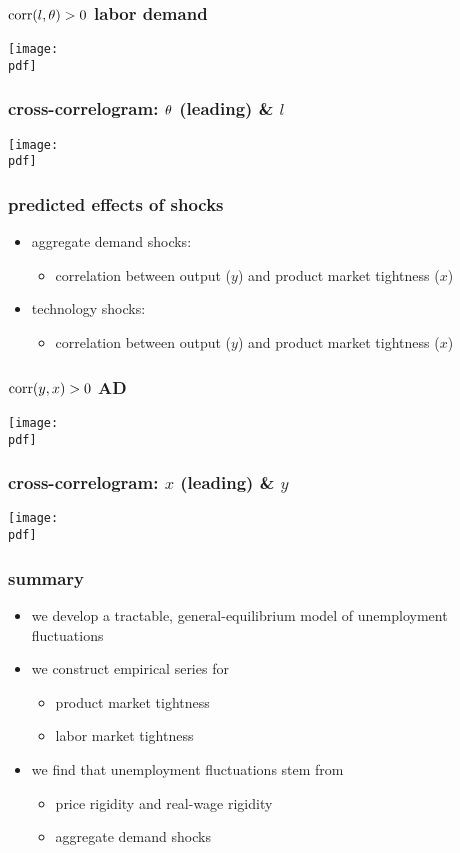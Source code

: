 \documentclass[12pt,xcolor={dvipsnames},hyperref={pdftex,pdfpagemode=UseNone,hidelinks,pdfdisplaydoctitle=true},usepdftitle=false]{beamer}
\def\pdf{xad.pdf}
\begin{document}
\begin{frame}
\frametitle{$\operatorname{corr}(l,\theta)>0$ \so labor demand}
\texttt{[image: \\pdf]}%
\end{frame}

\begin{frame}
\frametitle{cross-correlogram: $\theta$ (leading) \& $l$}
\texttt{[image: \\pdf]}%
\end{frame}

\begin{frame}
\end{frame}

\begin{frame}
\frametitle{predicted effects of shocks}
\begin{itemize}
\item aggregate demand shocks:
\begin{itemize}
\item {} correlation between output ($y$) and product market tightness ($x$)
\end{itemize}
\item technology shocks:
\begin{itemize}
\item {} correlation between output ($y$) and product market tightness ($x$)
\end{itemize}
\end{itemize}
\end{frame}

\begin{frame}
\frametitle{$\operatorname{corr}(y,x)>0$ \so AD}
\texttt{[image: \\pdf]}%
\end{frame}


\begin{frame}
\frametitle{cross-correlogram: $x$ (leading) \& $y$}
\texttt{[image: \\pdf]}%
\end{frame}

\begin{frame}
\end{frame}

\begin{frame}
\frametitle{summary}
\begin{itemize}
\item we develop a tractable, general-equilibrium model of unemployment fluctuations
\item we construct empirical series for
\begin{itemize}
\item product market tightness
\item labor market tightness
\end{itemize}
\item we find that unemployment fluctuations stem from
\begin{itemize}
\item price rigidity and real-wage rigidity
\item aggregate demand shocks
\end{itemize}
\end{itemize}
\end{frame}
\end{document}
